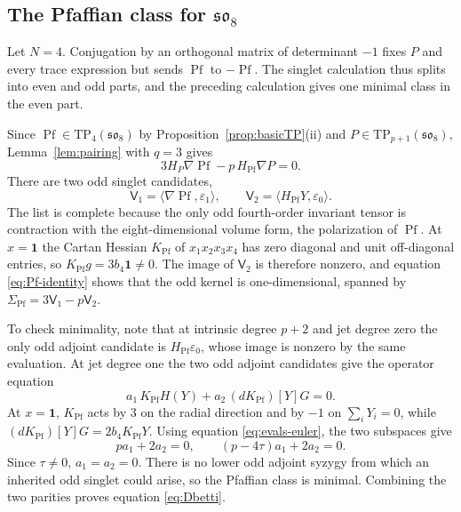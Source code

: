 \documentclass[10pt,reqno]{amsart}
\numberwithin{equation}{section}
\theoremstyle{plain}
\theoremstyle{definition}
\DeclareMathOperator{\Pf}{Pf}
\newcommand{\TP}{\mathrm{TP}}
\newcommand{\sV}{\mathsf{V}}
\newcommand{\ip}[2]{\langle #1, #2\rangle}
\begin{document}
\subsection{The Pfaffian class for \texorpdfstring{$\mathfrak{so}_8$}{so8}}\label{sec:Pf-class}

Let $N=4$. Conjugation by an orthogonal matrix of determinant $-1$ fixes $P$ and every trace expression but sends $\Pf$ to $-\Pf$. The singlet calculation thus splits into even and odd parts, and the preceding calculation gives one minimal class in the even part.

Since $\Pf\in\TP_4(\mathfrak{so}_8)$ by Proposition~\ref{prop:basicTP}(ii) and $P\in\TP_{p+1}(\mathfrak{so}_8)$, Lemma~\ref{lem:pairing} with $q=3$ gives
\begin{equation}\label{eq:Pf-identity}
	3H_P\nabla\Pf-p\,H_{\Pf}\nabla P=0 .
\end{equation}
There are two odd singlet candidates,
\begin{equation*}
	\sV_1=\ip{\nabla\Pf}{\varepsilon_1},\qquad \sV_2=\ip{H_{\Pf}Y}{\varepsilon_0}.
\end{equation*}
The list is complete because the only odd fourth-order invariant tensor is contraction with the eight-dimensional volume form, the polarization of $\Pf$. At $x=\mathbf 1$ the Cartan Hessian $K_{\Pf}$ of $x_1x_2x_3x_4$ has zero diagonal and unit off-diagonal entries, so $K_{\Pf}g=3b_4\mathbf 1\neq0$. The image of $\sV_2$ is therefore nonzero, and equation \eqref{eq:Pf-identity} shows that the odd kernel is one-dimensional, spanned by $\Sigma_{\Pf}=3\sV_1-p\sV_2$.

To check minimality, note that at intrinsic degree $p+2$ and jet degree zero the only odd adjoint candidate is $H_{\Pf}\varepsilon_0$, whose image is nonzero by the same evaluation. At jet degree one the two odd adjoint candidates give the operator equation
\begin{equation*}
	a_1\,K_{\Pf}H(Y)+a_2\,(dK_{\Pf})[Y]G=0 .
\end{equation*}
At $x=\mathbf 1$, $K_{\Pf}$ acts by $3$ on the radial direction and by $-1$ on $\sum_iY_i=0$, while $(dK_{\Pf})[Y]G=2b_4K_{\Pf}Y$. Using equation \eqref{eq:evals-euler}, the two subspaces give
\begin{equation*}
	pa_1+2a_2=0,\qquad (p-4\tau)a_1+2a_2=0 .
\end{equation*}
Since $\tau\neq0$, $a_1=a_2=0$. There is no lower odd adjoint syzygy from which an inherited odd singlet could arise, so the Pfaffian class is minimal. Combining the two parities proves equation \eqref{eq:Dbetti}.
\end{document}
